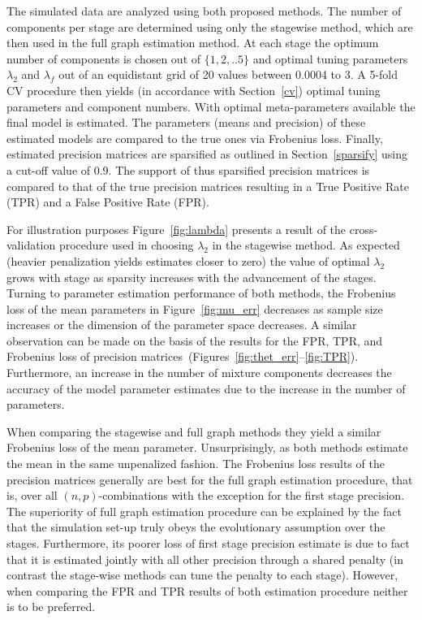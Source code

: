 \documentclass[10pt]{article}
\begin{document}
The simulated data are analyzed using both proposed methods. The number of components per stage are determined using only the stagewise method, which are then used in the full graph estimation method. At each stage the optimum number of components is chosen out of $\{1,2,..5\}$ and optimal tuning parameters $\lambda_2$ and $\lambda_f$ out of an equidistant grid of 20 values between 0.0004 to 3. A 5-fold CV procedure then yields (in accordance with Section~\ref{cv}) optimal tuning parameters and component numbers. With optimal meta-parameters available the final model is estimated. The parameters (means and precision) of these estimated models are compared to the true ones via Frobenius loss. Finally, estimated precision matrices are sparsified as outlined in Section~\ref{sparsify} using a cut-off value of $0.9$. The support of thus sparsified precision matrices is compared to that of the true precision matrices resulting in a True Positive Rate (TPR) and a False Positive Rate (FPR).

For illustration purposes Figure~\ref{fig:lambda} presents a result of the cross-validation procedure used  in choosing $\lambda_2$ in the stagewise method. As expected (heavier penalization yields estimates closer to zero) the value of optimal $\lambda_2$ grows with stage as sparsity increases with the advancement of the stages. Turning to parameter estimation performance of both methods, the Frobenius loss of the mean parameters in Figure~\ref{fig:mu_err} decreases as sample size increases or the dimension of the parameter space decreases. A similar observation can be made on the basis of the results for the FPR, TPR, and Frobenius loss of precision matrices~(Figures~\ref{fig:thet_err}--\ref{fig:TPR}). Furthermore, an increase in the number of mixture components decreases the accuracy of the model parameter estimates due to the increase in the number of parameters.


When comparing the stagewise and full graph methods they yield a similar Frobenius loss of the mean parameter. Unsurprisingly, as both methods estimate the mean in the same unpenalized fashion. The Frobenius loss results of the precision matrices generally are best for the full graph estimation procedure, that is, over all $(n, p)$-combinations with the exception for the first stage precision. The superiority of full graph estimation procedure can be explained by the fact that the simulation set-up truly obeys the evolutionary assumption over the stages. Furthermore, its poorer loss of first stage precision estimate is due to fact that it is estimated jointly with all other precision through a shared penalty (in contrast the stage-wise methods can tune the penalty to each stage). However, when comparing the FPR and TPR results of both estimation procedure neither is to be preferred.
\end{document}
